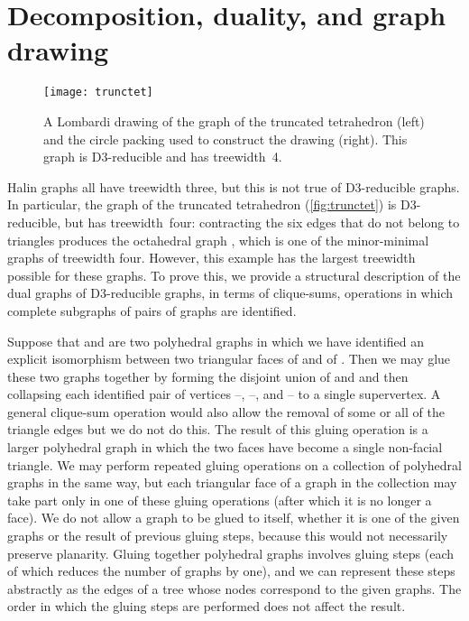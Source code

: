 \documentclass{article}
\begin{document}
\section{Decomposition, duality, and graph drawing}

\begin{figure}[b]
\centering\texttt{[image: trunctet]}
\caption{A Lombardi drawing of the graph of the truncated tetrahedron (left) and the circle packing used to construct the drawing (right). This graph is D3-reducible and has treewidth~4.}
\label{fig:trunctet}
\end{figure}

Halin graphs all have treewidth three, but this is not true of D3-reducible graphs. In particular, the graph of the truncated tetrahedron (\autoref{fig:trunctet}) is D3-reducible, but has treewidth~four: contracting the six edges that do not belong to triangles produces the octahedral graph , which is one of the minor-minimal graphs of treewidth four. However, this example has the largest treewidth possible for these graphs. To prove this, we provide a structural description of the dual graphs of D3-reducible graphs, in terms of clique-sums, operations in which complete subgraphs of pairs of graphs are identified.

Suppose that  and  are two polyhedral graphs in which we have identified an explicit isomorphism between two triangular faces  of  and  of . Then we may glue these two graphs together by forming the disjoint union of  and  and then collapsing each identified pair of vertices --, --, and -- to a single supervertex. A general clique-sum operation would also allow the removal of some or all of the triangle edges but we do not do this. The result of this gluing operation is a larger polyhedral graph in which the two faces have become a single non-facial triangle. We may perform repeated gluing operations on a collection of polyhedral graphs in the same way, but each triangular face of a graph in the collection may take part only in one of these gluing operations (after which it is no longer a face). We do not allow a graph to be glued to itself, whether it is one of the given graphs or the result of previous gluing steps, because this would not necessarily preserve planarity. Gluing together  polyhedral graphs involves  gluing steps (each of which reduces the number of graphs by one), and we can represent these steps abstractly as the edges of a tree whose nodes correspond to the given graphs. The order in which the gluing steps are performed does not affect the result.
\end{document}
